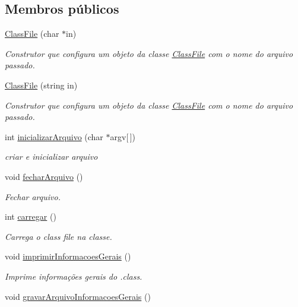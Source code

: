 \subsection*{Membros públicos}
\begin{DoxyCompactItemize}
\item 
\hyperlink{classClassFile_a7cf76bcaf785b984e9d1b31d52a5aa7f}{Class\+File} (char $\ast$in)
\begin{DoxyCompactList}\small\item\em Construtor que configura um objeto da classe \hyperlink{classClassFile}{Class\+File} com o nome do arquivo passado. \end{DoxyCompactList}\item 
\hyperlink{classClassFile_ab442e7b0a5f8c4eeae4f668c4e02c396}{Class\+File} (string in)
\begin{DoxyCompactList}\small\item\em Construtor que configura um objeto da classe \hyperlink{classClassFile}{Class\+File} com o nome do arquivo passado. \end{DoxyCompactList}\item 
int \hyperlink{classClassFile_a5fa3d7587821ed1c8e3eabb94544da29}{inicializar\+Arquivo} (char $\ast$argv\mbox{[}$\,$\mbox{]})
\begin{DoxyCompactList}\small\item\em criar e inicializar arquivo \end{DoxyCompactList}\item 
void \hyperlink{classClassFile_a581c453009afcb8b7a2861a2de8cfb5c}{fechar\+Arquivo} ()
\begin{DoxyCompactList}\small\item\em Fechar arquivo. \end{DoxyCompactList}\item 
int \hyperlink{classClassFile_a619e102ada15202ab84981d43362a3e9}{carregar} ()
\begin{DoxyCompactList}\small\item\em Carrega o class file na classe. \end{DoxyCompactList}\item 
void \hyperlink{classClassFile_a482ed64fcd8a1b79d3622b3f59b5767a}{imprimir\+Informacoes\+Gerais} ()
\begin{DoxyCompactList}\small\item\em Imprime informações gerais do .class. \end{DoxyCompactList}\item 
void \hyperlink{classClassFile_a4a685afd10dc5aaacd5a71ed535895c6}{gravar\+Arquivo\+Informacoes\+Gerais} ()

\end{DoxyCompactItemize}
